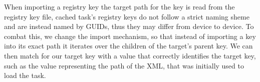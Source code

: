 

When importing a registry key the target path for the key is read from the registry key file, cached task's registry keys do not follow a strict naming sheme and are instead named by GUIDs, thus they may differ from device to device. To combat this, we change the import mechanism, so that instead of importing a key into its exact path it iterates over the children of the target's parent key. We can then match for our target key with a value that correctly identifies the target key, such as the value representing the path of the XML, that was initially used to load the task.






